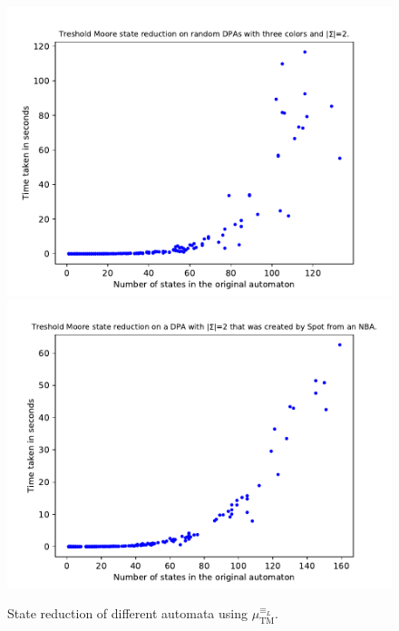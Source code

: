 \begin{figure}
\begin{minipage}{0.49\textwidth}
		\caption{State reduction of different automata using $\mu_\text{TM}^{\equiv_L}$.}
		\label{fig:tremoore:empirical_size_hist}
	\end{minipage}
	\hfill
	\begin{minipage}{0.49\textwidth}
		\includegraphics[page=3,height=.3\textheight]{../data/analysis/threshold_moore/gendet_ap1.pdf} 
		\includegraphics[page=3,height=.3\textheight]{../data/analysis/threshold_moore/detspot_ap1.pdf} 

\end{minipage}
\end{figure}
